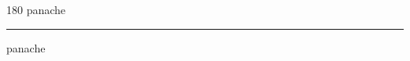 
\begin{frame}
\begin{center}
\begin{turn}{180}
{\fontsize{2.5cm}{1em}\selectfont panache}
\end{turn}
\vspace{1em}\par  
\hrule
\vspace{1em}\par  
{\fontsize{2.5cm}{1em}\selectfont panache}
\end{center}
\end{frame}
